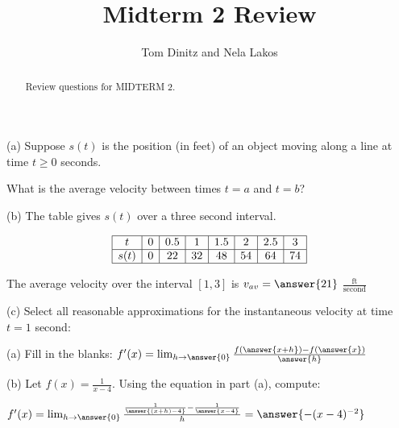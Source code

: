 \documentclass{ximera}
\author{Tom Dinitz and Nela Lakos}
\title{Midterm 2 Review}
\begin{document}
\begin{abstract}
Review questions for MIDTERM 2.
\end{abstract}
\maketitle

\begin{exercise}
  (a) Suppose $s(t)$ is the position (in feet) of an object moving along a line at time $t\geq 0$ seconds. 
  
  What is the average velocity between times $t=a$ and $t=b$?
  \begin{prompt}
    \begin{multipleChoice}
    \end{multipleChoice}
  \end{prompt}
  
  (b) The table gives $s(t)$ over a three second interval.

  \[
  \begin{array}{|c|c|c|c|c|c|c|c|}
    \hline
    t& 0& 0.5& 1& 1.5& 2& 2.5& 3\\ \hline
    s(t)& 0 & 22 & 32 & 48 & 54 & 64 & 74 \\ \hline
  \end{array}
  \]
  
  The average velocity over the interval $[1,3]$ is $v_{av}=\answer{21}$ $\frac{\text{ft}}{\text{second}}$
  
  (c) Select all reasonable approximations for the instantaneous velocity at time $t=1$ second:
  \begin{selectAll}
  \end{selectAll}
\end{exercise}

\begin{exercise}
  (a) Fill in the blanks: $f'(x)=\lim_{h\to\answer{0}}\frac{f(\answer{x+h})-f(\answer{x})}{\answer{h}}$
  
  (b) Let $f(x)=\frac{1}{x-4}$. Using the equation in part (a), compute:
  
  $f'(x)=\lim_{h\to\answer{0}}\frac{\frac{1}{\answer{(x+h)-4}}-\frac{1}{\answer{x-4}}}{h}=\answer{-(x-4)^{-2}}$
  
\end{exercise}
\end{document}
